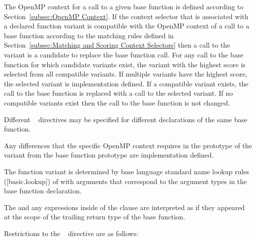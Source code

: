 The OpenMP context for a call to a given base function is defined according 
to Section~\ref{subsec:OpenMP Context}. If the context selector that is 
associated with a declared function variant is compatible with the OpenMP 
context of a call to a base function according to the matching rules defined in
Section~\ref{subsec:Matching and Scoring Context Selectors} then a call to
the variant is a candidate to replace the base function call. For any call
to the base function for which candidate variants exist, the variant with 
the highest score is selected from all compatible variants. If multiple 
variants have the highest score, the selected variant is implementation 
defined. If a compatible variant exists, the call to the base function is 
replaced with a call to the selected variant. If no compatible variants 
exist then the call to the base function is not changed.

Different ~ directives may be specified for
different declarations of the same base function.

Any differences that the specific OpenMP context requires in the prototype 
of the variant from the base function prototype are implementation defined.

\begin{cppspecific}
The function variant is determined by base language standard name lookup
rules ([basic.lookup]) of  with arguments that correspond
to the argument types in the base function declaration.

The  and any expressions inside of the 
clause are interpreted as if they appeared at the scope of the trailing return
type of the base function.
\end{cppspecific}

\restrictions
Restrictions to the ~ directive are as follows:

